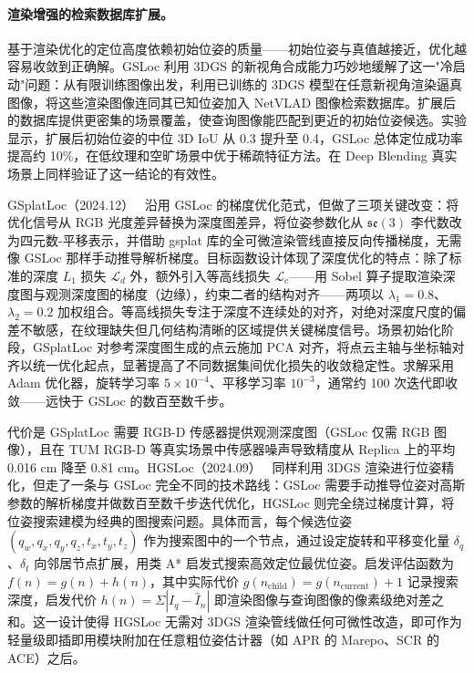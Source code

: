 \paragraph{渲染增强的检索数据库扩展。}
基于渲染优化的定位高度依赖初始位姿的质量——初始位姿与真值越接近，优化越容易收敛到正确解。GSLoc 利用 3DGS 的新视角合成能力巧妙地缓解了这一"冷启动"问题：从有限训练图像出发，利用已训练的 3DGS 模型在任意新视角渲染逼真图像，将这些渲染图像连同其已知位姿加入 NetVLAD 图像检索数据库。扩展后的数据库提供更密集的场景覆盖，使查询图像能匹配到更近的初始位姿候选。实验显示，扩展后初始位姿的中位 3D IoU 从 0.3 提升至 0.4，GSLoc 总体定位成功率提高约 10\%，在低纹理和空旷场景中优于稀疏特征方法。在 Deep Blending 真实场景上同样验证了这一结论的有效性。

GSplatLoc（2024.12）~\cite{2412_20056} 沿用 GSLoc 的梯度优化范式，但做了三项关键改变：将优化信号从 RGB 光度差异替换为深度图差异，将位姿参数化从 $\mathfrak{se}(3)$ 李代数改为四元数-平移表示，并借助 gsplat 库的全可微渲染管线直接反向传播梯度，无需像 GSLoc 那样手动推导解析梯度。目标函数设计体现了深度优化的特点：除了标准的深度 $L_1$ 损失 $\mathcal{L}_d$ 外，额外引入等高线损失 $\mathcal{L}_c$——用 Sobel 算子提取渲染深度图与观测深度图的梯度（边缘），约束二者的结构对齐——两项以 $\lambda_1\!=\!0.8$、$\lambda_2\!=\!0.2$ 加权组合。等高线损失专注于深度不连续处的对齐，对绝对深度尺度的偏差不敏感，在纹理缺失但几何结构清晰的区域提供关键梯度信号。场景初始化阶段，GSplatLoc 对参考深度图生成的点云施加 PCA 对齐，将点云主轴与坐标轴对齐以统一优化起点，显著提高了不同数据集间优化损失的收敛稳定性。求解采用 Adam 优化器，旋转学习率 $5\!\times\!10^{-4}$、平移学习率 $10^{-3}$，通常约 100 次迭代即收敛——远快于 GSLoc 的数百至数千步。

代价是 GSplatLoc 需要 RGB-D 传感器提供观测深度图（GSLoc 仅需 RGB 图像），且在 TUM RGB-D 等真实场景中传感器噪声导致精度从 Replica 上的平均 0.016 cm 降至 0.81 cm。HGSLoc（2024.09）~\cite{2409_10925} 同样利用 3DGS 渲染进行位姿精化，但走了一条与 GSLoc 完全不同的技术路线：GSLoc 需要手动推导位姿对高斯参数的解析梯度并做数百至数千步迭代优化，HGSLoc 则完全绕过梯度计算，将位姿搜索建模为经典的图搜索问题。具体而言，每个候选位姿 $(q_w, q_x, q_y, q_z, t_x, t_y, t_z)$ 作为搜索图中的一个节点，通过设定旋转和平移变化量 $\delta_q$、$\delta_t$ 向邻居节点扩展，用类 A* 启发式搜索高效定位最优位姿。启发评估函数为 $f(n) = g(n) + h(n)$，其中实际代价 $g(n_{\text{child}}) = g(n_{\text{current}}) + 1$ 记录搜索深度，启发代价 $h(n) = \Sigma |I_q - \hat{I}_n|$ 即渲染图像与查询图像的像素级绝对差之和。这一设计使得 HGSLoc 无需对 3DGS 渲染管线做任何可微性改造，即可作为轻量级即插即用模块附加在任意粗位姿估计器（如 APR 的 Marepo、SCR 的 ACE）之后。

